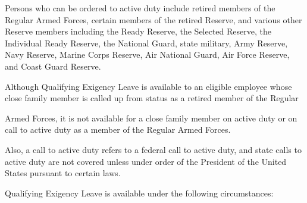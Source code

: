 Persons who can be ordered to active duty include retired members of the Regular Armed Forces, certain members of the retired Reserve, and various other Reserve members including the Ready Reserve, the Selected Reserve, the Individual Ready Reserve, the National Guard, state military, Army Reserve, Navy Reserve, Marine Corps Reserve, Air National Guard, Air Force Reserve, and Coast Guard Reserve.

Although Qualifying Exigency Leave is available to an eligible employee whose close family member is called up from status as a retired member of the Regular

Armed Forces, it is not available for a close family member on active duty or on call to active duty as a member of the Regular Armed Forces.

Also, a call to active duty refers to a federal call to active duty, and state calls to active duty are not covered unless under order of the President of the United States pursuant to certain laws.

Qualifying Exigency Leave is available under the following circumstances:

